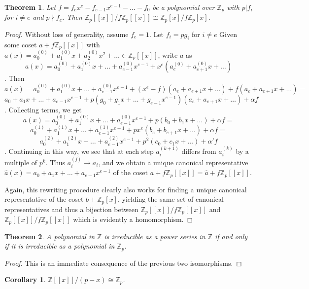\documentclass{article}
\newtheorem{theorem}{Theorem}
\newtheorem{corollary}{Corollary}
\begin{document}
\begin{theorem}
Let $f=f_ex^e - f_{e-1}x^{e-1} - \ldots - f_0$ be a polynomial over $\mathbb{Z}_p$ with $p | f_i$ for $i \ne e$ and $p \nmid f_e$.  Then $\mathbb{Z}_p[[x]]/f\mathbb{Z}_p[[x]] \cong \mathbb{Z}_p[x]/f\mathbb{Z}_p[x]$.
\end{theorem}
\begin{proof}
Without loss of generality, assume $f_e = 1$.  Let $f_i = pg_i$ for $i \ne e$ Given some coset $a + f\mathbb{Z}_p[[x]]$ with $a(x) = a_0^{(0)} + a_1^{(0)}x + a_2^{(0)}x^2 + \ldots \in \mathbb{Z}_p[[x]]$, write $a$ as $$a(x) = a_0^{(0)} + a_1^{(0)}x + \ldots + a_{e-1}^{(0)}x^{e-1} + x^e(a_e^{(0)} + a_{e+1}^{(0)}x + \ldots)$$.  Then $$a(x) = a_0^{(0)} + a_1^{(0)}x + \ldots + a_{e-1}^{(0)}x^{e-1} + (x^e - f)(a_e + a_{e+1}x + \ldots) + f(a_e + a_{e+1}x + \ldots) = $$
$$a_0 + a_1x + \ldots + a_{e-1}x^{e-1} + p(g_0 + g_1x + \ldots + g_{e-1}x^{e-1})(a_e + a_{e+1}x + \ldots) + \alpha f$$.  Collecting terms, we get $$a(x) = a_0^{(0)} + a_1^{(0)}x + \ldots + a_{e-1}^{(0)}x^{e-1} + p(b_0 + b_1x + \ldots) + \alpha f = $$
$$a_0^{(1)} + a_1^{(1)}x + \ldots + a_{e-1}^{(1)}x^{e-1} + px^e(b_e + b_{e+1}x + \dots) + \alpha f =$$
$$a_0^{(2)} + a_1^{(2)}x + \ldots + a_{e-1}^{(2)}x^{e-1} + p^2(c_0 + c_1x + \ldots) + \alpha'f$$.  Continuing in this way, we see that at each step $a_i^{(k+1)}$ differs from $a_i^{(k)}$ by a multiple of $p^k$.  Thus $a_i^{(j)} \to a_i$, and we obtain a unique canonical representative $\hat{a}(x) = a_0 + a_1x + \ldots + a_{e-1}x^{e-1}$ of the coset $a + f\mathbb{Z}_p[[x]] = \hat{a} + f\mathbb{Z}_p[[x]]$.

Again, this rewriting procedure clearly also works for finding a unique canonical representative of the coset $b + \mathbb{Z}_p[x]$, yielding the same set of canonical representatives and thus a bijection between $\mathbb{Z}_p[[x]]/f\mathbb{Z}_p[[x]]$ and $\mathbb{Z}_p[[x]]/f\mathbb{Z}_p[[x]]$ which is evidently a homomorphism.
\end{proof}

\begin{theorem}
A polynomial in $\mathbb{Z}$ is irreducible as a power series in $\mathbb{Z}$ if and only if it is irreducible as a polynomial in $\mathbb{Z}_p$.
\end{theorem}
\begin{proof}
This is an immediate consequence of the previous two isomorphisms.
\end{proof}

\begin{corollary}
$\mathbb{Z}[[x]]/(p-x) \cong \mathbb{Z}_p$.
\end{corollary}
\end{document}
